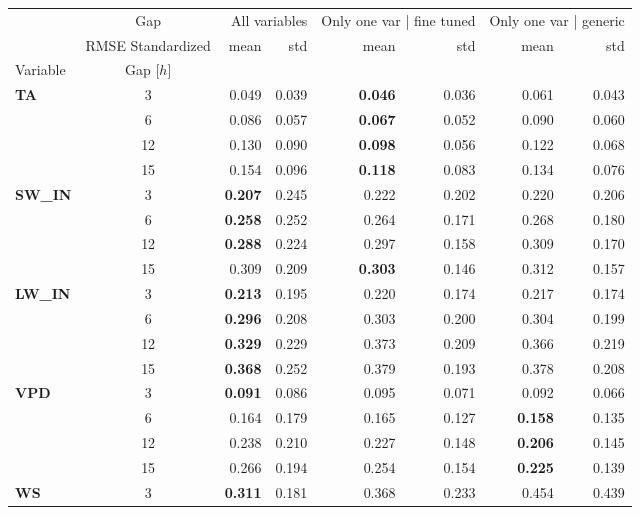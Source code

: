 \begin{table}
\centering
\begin{tabular}{p{2.1cm}c|rr|rr|rr}
\toprule
 & Gap & \multicolumn{2}{r}{All variables} & \multicolumn{2}{r}{Only one var | fine tuned} & \multicolumn{2}{r}{Only one var | generic} \\
 & RMSE Standardized & mean & std & mean & std & mean & std \\
Variable & Gap [$h$] &  &  &  &  &  &  \\
\midrule
\multirow[c]{4}{*}{\parbox{2.1cm}{\textbf{TA}}} & 3 & 0.049 & 0.039 & \bfseries 0.046 & 0.036 & 0.061 & 0.043 \\
 & 6 & 0.086 & 0.057 & \bfseries 0.067 & 0.052 & 0.090 & 0.060 \\
 & 12 & 0.130 & 0.090 & \bfseries 0.098 & 0.056 & 0.122 & 0.068 \\
 & 15 & 0.154 & 0.096 & \bfseries 0.118 & 0.083 & 0.134 & 0.076 \\
\cline{1-8}
\multirow[c]{4}{*}{\parbox{2.1cm}{\textbf{SW\_IN}}} & 3 & \bfseries 0.207 & 0.245 & 0.222 & 0.202 & 0.220 & 0.206 \\
 & 6 & \bfseries 0.258 & 0.252 & 0.264 & 0.171 & 0.268 & 0.180 \\
 & 12 & \bfseries 0.288 & 0.224 & 0.297 & 0.158 & 0.309 & 0.170 \\
 & 15 & 0.309 & 0.209 & \bfseries 0.303 & 0.146 & 0.312 & 0.157 \\
\cline{1-8}
\multirow[c]{4}{*}{\parbox{2.1cm}{\textbf{LW\_IN}}} & 3 & \bfseries 0.213 & 0.195 & 0.220 & 0.174 & 0.217 & 0.174 \\
 & 6 & \bfseries 0.296 & 0.208 & 0.303 & 0.200 & 0.304 & 0.199 \\
 & 12 & \bfseries 0.329 & 0.229 & 0.373 & 0.209 & 0.366 & 0.219 \\
 & 15 & \bfseries 0.368 & 0.252 & 0.379 & 0.193 & 0.378 & 0.208 \\
\cline{1-8}
\multirow[c]{4}{*}{\parbox{2.1cm}{\textbf{VPD}}} & 3 & \bfseries 0.091 & 0.086 & 0.095 & 0.071 & 0.092 & 0.066 \\
 & 6 & 0.164 & 0.179 & 0.165 & 0.127 & \bfseries 0.158 & 0.135 \\
 & 12 & 0.238 & 0.210 & 0.227 & 0.148 & \bfseries 0.206 & 0.145 \\
 & 15 & 0.266 & 0.194 & 0.254 & 0.154 & \bfseries 0.225 & 0.139 \\
\cline{1-8}
\multirow[c]{4}{*}{\parbox{2.1cm}{\textbf{WS}}} & 3 & \bfseries 0.311 & 0.181 & 0.368 & 0.233 & 0.454 & 0.439 \\

\end{tabular}
\end{table}
